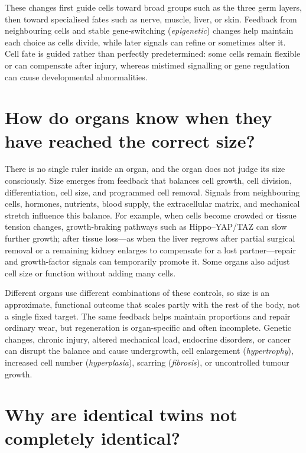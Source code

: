 \documentclass[11pt,oneside]{report}
\begin{document}
These changes first guide cells toward broad groups such as the three germ
layers, then toward specialised fates such as nerve, muscle, liver, or skin.
Feedback from neighbouring cells and stable gene-switching
(\emph{epigenetic}) changes help maintain each choice as cells divide, while
later signals can refine or sometimes alter it. Cell fate is guided rather than perfectly predetermined: some cells remain
flexible or can compensate after injury, whereas mistimed signalling or gene
regulation can cause developmental abnormalities.

\section{How do organs know when they have reached the correct size?}

There is no single ruler inside an organ, and the organ does not judge its size
consciously. Size emerges from feedback that balances cell growth, cell
division, differentiation, cell size, and programmed cell removal. Signals
from neighbouring cells, hormones, nutrients, blood supply, the extracellular
matrix, and mechanical stretch influence this balance. For example, when cells
become crowded or tissue tension changes, growth-braking pathways such as
Hippo--YAP/TAZ can slow further growth; after tissue loss—as when the liver
regrows after partial surgical removal or a remaining kidney enlarges to
compensate for a lost partner—repair and growth-factor signals can temporarily
promote it. Some organs also adjust cell size or function without
adding many cells.

Different organs use different combinations of these controls, so size is an
approximate, functional outcome that scales partly with the rest of the body,
not a single fixed target. The same feedback helps maintain proportions and
repair ordinary wear, but regeneration is organ-specific and often incomplete.
Genetic changes, chronic injury, altered mechanical load, endocrine disorders,
or cancer can disrupt the balance and cause undergrowth, cell enlargement
(\emph{hypertrophy}), increased cell number (\emph{hyperplasia}), scarring
(\emph{fibrosis}), or uncontrolled tumour growth.

\section{Why are identical twins not completely identical?}
\end{document}
